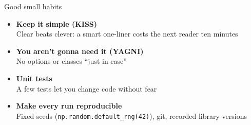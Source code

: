 \begin{frame}[fragile]{Good small habits}


    \vfill

    \centering
    \begin{minipage}{0.78\textwidth}
        \begin{itemize}
            \setlength{\itemsep}{1.1em}
            \item<1-> {\large\textbf{Keep it simple (KISS)}}\\
                {\small\textcolor{talkdim}{Clear beats clever: a smart one-liner costs the next reader ten minutes}}
            \item<2-> {\large\textbf{You aren't gonna need it (YAGNI)}}\\
                {\small\textcolor{talkdim}{No options or classes ``just in case''}}
            \item<3-> {\large\textbf{Unit tests}}\\
                {\small\textcolor{talkdim}{A few tests let you change code without fear}}
            \item<4-> {\large\textbf{Make every run reproducible}}\\
                {\small\textcolor{talkdim}{Fixed seeds (}\texttt{np.random.default_rng(42)}\textcolor{talkdim}{), git, recorded library versions}}
        \end{itemize}
    \end{minipage}

    \vfill

\end{frame}
